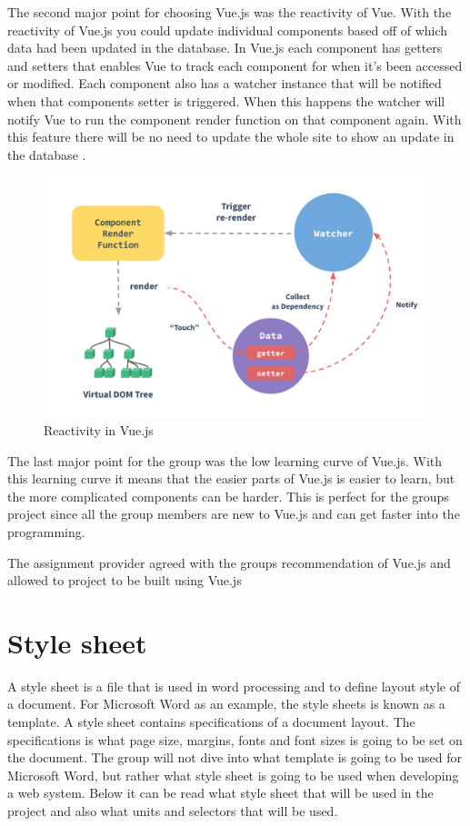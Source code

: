 The second major point for choosing Vue.js was the reactivity of Vue. With the reactivity of Vue.js you could update individual components based off of which data had been updated in the database. In Vue.js each component has getters and setters that enables Vue to track each component for when it's been accessed or modified. Each component also has a watcher instance that will be notified when that components setter is triggered. When this happens the watcher will notify Vue to run the component render function on that component again. With this feature there will be no need to update the whole site to show an update in the database \cite{vue-reactivity}. 

\begin{figure}[h]
    \centering
    \includegraphics[width=115mm,scale=1]{figures/reactivity.png}
    \caption{Reactivity in Vue.js}
    \label{fig:vue_reactivity}
\end{figure}

The last major point for the group was the low learning curve of Vue.js. With this learning curve it means that the easier parts of Vue.js is easier to learn, but the more complicated components can be harder. This is perfect for the groups project since all the group members are new to Vue.js and can get faster into the programming.

The assignment provider agreed with the groups recommendation of Vue.js and allowed to project to be built using Vue.js

\section{Style sheet}
A style sheet is a file that is used in word processing and to define layout style of a document\cite{Style_sheet}.
For Microsoft Word as an example, the style sheets is known as a template\cite{Style_sheet}.
A style sheet contains specifications of a document layout\cite{Style_sheet}. 
The specifications is what page size, margins, fonts and font sizes is going to be set on the document\cite{Style_sheet}.
The group will not dive into what template is going to be used for Microsoft Word, but rather what style sheet is going to be used when developing a web system. Below it can be read what style sheet that will be used in the project and also what units and selectors that will be used. 

